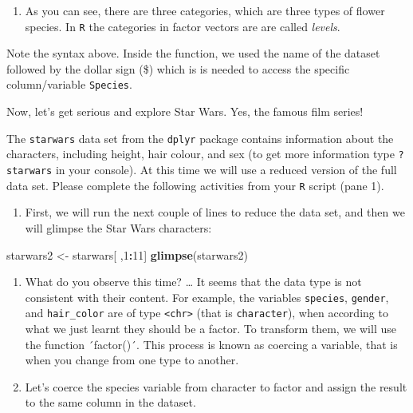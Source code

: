 \documentclass[
]{book}
\newenvironment{Shaded}{\begin{snugshade}}{\end{snugshade}}
\newcommand{\DecValTok}[1]{\textcolor[rgb]{0.00,0.00,0.81}{#1}}
\newcommand{\FunctionTok}[1]{\textcolor[rgb]{0.13,0.29,0.53}{\textbf{#1}}}
\newcommand{\NormalTok}[1]{#1}
\newcommand{\OtherTok}[1]{\textcolor[rgb]{0.56,0.35,0.01}{#1}}
\newcommand{\SpecialCharTok}[1]{\textcolor[rgb]{0.81,0.36,0.00}{\textbf{#1}}}
\providecommand{\tightlist}{%
  \setlength{\itemsep}{0pt}\setlength{\parskip}{0pt}}
\begin{document}
\begin{Shaded}
\end{Shaded}

\begin{enumerate}
\def\labelenumi{\arabic{enumi}.}
\setcounter{enumi}{3}
\tightlist
\item
  As you can see, there are three categories, which are three types of flower species. In \texttt{R} the categories in factor vectors are are called \emph{levels}.
\end{enumerate}

Note the syntax above. Inside the function, we used the name of the dataset followed by the dollar sign (\$) which is is needed to access the specific column/variable \texttt{Species}.

Now, let's get serious and explore Star Wars. Yes, the famous film series!

The \texttt{starwars} data set from the \texttt{dplyr} package contains information about the characters, including height, hair colour, and sex (to get more information type \texttt{?starwars} in your console). At this time we will use a reduced version of the full data set. Please complete the following activities from your \texttt{R} script (pane 1).

\begin{enumerate}
\def\labelenumi{\arabic{enumi}.}
\tightlist
\item
  First, we will run the next couple of lines to reduce the data set, and then we will glimpse the Star Wars characters:
\end{enumerate}

\begin{Shaded}
\begin{Highlighting}[]
\NormalTok{starwars2 }\OtherTok{\textless{}{-}}\NormalTok{ starwars[ ,}\DecValTok{1}\SpecialCharTok{:}\DecValTok{11}\NormalTok{]}
\FunctionTok{glimpse}\NormalTok{(starwars2)}
\end{Highlighting}
\end{Shaded}

\begin{enumerate}
\def\labelenumi{\arabic{enumi}.}
\setcounter{enumi}{1}
\tightlist
\item
  What do you observe this time? \ldots{} It seems that the data type is not consistent with their content. For example, the variables \texttt{species}, \texttt{gender}, and \texttt{hair\_color} are of type \texttt{\textless{}chr\textgreater{}} (that is \texttt{character}), when according to what we just learnt they should be a factor. To transform them, we will use the function ´factor()´. This process is known as coercing a variable, that is when you change from one type to another.
\item
  Let's coerce the species variable from character to factor and assign the result to the same column in the dataset.
\end{enumerate}
\end{document}
